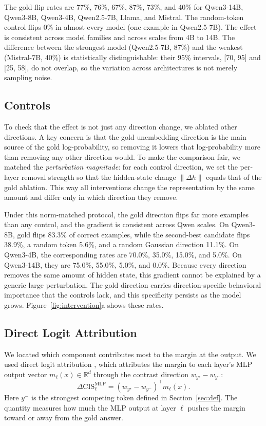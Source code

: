 \documentclass{article} %
\begin{document}
The gold flip rates are 77\%, 76\%, 67\%, 87\%, 73\%, and 40\% for Qwen3-14B, Qwen3-8B, Qwen3-4B, Qwen2.5-7B, Llama, and Mistral. The random-token control flips 0\% in almost every model (one example in Qwen2.5-7B). The effect is consistent across model families and across scales from 4B to 14B. The difference between the strongest model (Qwen2.5-7B, 87\%) and the weakest (Mistral-7B, 40\%) is statistically distinguishable: their 95\% intervals, [70, 95] and [25, 58], do not overlap, so the variation across architectures is not merely sampling noise.

\subsection{Controls}

To check that the effect is not just any direction change, we ablated other directions. A key concern is that the gold unembedding direction is the main source of the gold log-probability, so removing it lowers that log-probability more than removing any other direction would. To make the comparison fair, we matched the \emph{perturbation magnitude}: for each control direction, we set the per-layer removal strength so that the hidden-state change $\lVert \Delta h \rVert$ equals that of the gold ablation. This way all interventions change the representation by the same amount and differ only in which direction they remove.

Under this norm-matched protocol, the gold direction flips far more examples than any control, and the gradient is consistent across Qwen scales. On Qwen3-8B, gold flips 83.3\% of correct examples, while the second-best candidate flips 38.9\%, a random token 5.6\%, and a random Gaussian direction 11.1\%. On Qwen3-4B, the corresponding rates are 70.0\%, 35.0\%, 15.0\%, and 5.0\%. On Qwen3-14B, they are 75.0\%, 55.0\%, 5.0\%, and 0.0\%. Because every direction removes the same amount of hidden state, this gradient cannot be explained by a generic large perturbation. The gold direction carries direction-specific behavioral importance that the controls lack, and this specificity persists as the model grows. Figure~\ref{fig:intervention}a shows these rates.

\subsection{Direct Logit Attribution}

We located which component contributes most to the margin at the output. We used direct logit attribution \citep{elhage2021mathematical, geva2021transformer}, which attributes the margin to each layer's MLP output vector $m_\ell(x) \in \mathbb{R}^d$ through the contrast direction $w_{y^\star} - w_{y^-}$:
\begin{equation}
\Delta \mathrm{CIS}^{\mathrm{MLP}}_\ell = (w_{y^\star} - w_{y^-})^\top m_\ell(x) .
\end{equation}
Here $y^-$ is the strongest competing token defined in Section~\ref{sec:def}. The quantity measures how much the MLP output at layer $\ell$ pushes the margin toward or away from the gold answer.
\end{document}
